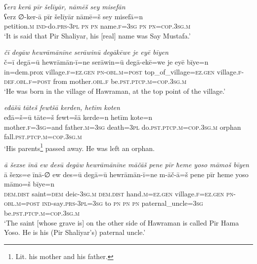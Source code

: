 \ea \label{ZP.1}
\textit{ʕerz kerā pīr šelīyār, nāmēš sey misefān} \\ 
\gll ʕerz ∅-ker-ā pīr šelīyār nāmē=š sey misefā=n \\ 
 petition\textsc{.m} \textsc{ind-}do\textsc{.prs}\textsc{-3pl} \textsc{pn} \textsc{pn} name\textsc{.f}\textsc{=3sg} \textsc{pn} \textsc{pn}\textsc{=cop}\textsc{.3sg}\textsc{.m} \\ 
\glt `It is said that Pir Shaliyar, his [real] name was Say Mustafa.'
\z 
 
\ea \label{ZP.3}
\textit{čī degāw hewrāmānīne serāwinū degākēwe je eyē bīyen} \\ 
\gll č=ī degā=ū hewrāmān-ī=ne serāwin=ū degā-ekē=we je eyē bīye=n \\ 
 in=dem.prox village\textsc{.f}\textsc{\textsc{=ez.gen}} \textsc{pn}\textsc{-obl}\textsc{.m}\textsc{=\textsc{post}} top\_of\_village\textsc{\textsc{=ez.gen}} village\textsc{.f}\textsc{-def}\textsc{.obl}\textsc{.f}\textsc{=\textsc{post}} from mother\textsc{.obl}\textsc{.f} be\textsc{.pst}\textsc{.ptcp}\textsc{.m}\textsc{=cop}\textsc{.3sg}\textsc{.m} \\ 
\glt `He was born in the village of Hawraman, at the top point of the village.'
\z 
 
\ea \label{ZP.4}
\textit{eđāšū tāteš fewtšā kerden, hetīm koten} \\ 
\gll eđā=š=ū tāte=š fewt=šā kerde=n hetīm kote=n \\ 
 mother\textsc{.f}\textsc{=3sg}=and father\textsc{.m}\textsc{=3sg} death\textsc{=3pl} do\textsc{.pst}\textsc{.ptcp}\textsc{.m}\textsc{=cop}\textsc{.3sg}\textsc{.m} orphan fall\textsc{.pst}\textsc{.ptcp}\textsc{.m}\textsc{=cop}\textsc{.3sg}\textsc{.m} \\ 
\glt `His parents\footnote{Lit. his mother and his father.} passed away. He was left an orphan.\\ 
\z 

\ea \label{ZP.6}
\textit{ā šexse īnā ew desū degāw hewrāmānīne māčāš pene pīr ħeme yoso māmoš bīyen} \\ 
\gll ā šexs=e īnā-∅ ew des=ū degā=ū hewrāmān-ī=ne m-āč-ā=š pene pīr ħeme yoso māmo=š bīye=n \\ 
 \textsc{dem.dist} saint\textsc{=dem} deic\textsc{-3sg}\textsc{.m} \textsc{dem.dist} hand\textsc{.m}\textsc{\textsc{=ez.gen}} village\textsc{.f}\textsc{\textsc{=ez.gen}} \textsc{pn}\textsc{-obl}\textsc{.m}\textsc{=\textsc{post}} \textsc{ind-}say\textsc{.prs}\textsc{-3pl}\textsc{=3sg} to \textsc{pn} \textsc{pn} \textsc{pn} paternal\_uncle\textsc{=3sg} be\textsc{.pst}\textsc{.ptcp}\textsc{.m}\textsc{=cop}\textsc{.3sg}\textsc{.m} \\ 
\glt `The saint [whose grave is] on the other side of Hawraman is called Pir Hama Yoso. He is his (Pir Shaliyar’s) paternal uncle.'
\z 
 
